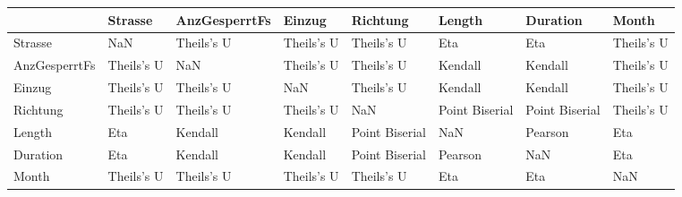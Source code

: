 \begin{tabular}{llllllll}
\toprule
{} &     Strasse & AnzGesperrtFs &      Einzug &        Richtung &          Length &        Duration &       Month \\
\midrule
Strasse       &         NaN &    Theils's U &  Theils's U &      Theils's U &             Eta &             Eta &  Theils's U \\
AnzGesperrtFs &  Theils's U &           NaN &  Theils's U &      Theils's U &         Kendall &         Kendall &  Theils's U \\
Einzug        &  Theils's U &    Theils's U &         NaN &      Theils's U &         Kendall &         Kendall &  Theils's U \\
Richtung      &  Theils's U &    Theils's U &  Theils's U &             NaN &  Point Biserial &  Point Biserial &  Theils's U \\
Length        &         Eta &       Kendall &     Kendall &  Point Biserial &             NaN &         Pearson &         Eta \\
Duration      &         Eta &       Kendall &     Kendall &  Point Biserial &         Pearson &             NaN &         Eta \\
Month         &  Theils's U &    Theils's U &  Theils's U &      Theils's U &             Eta &             Eta &         NaN \\
\bottomrule
\end{tabular}
